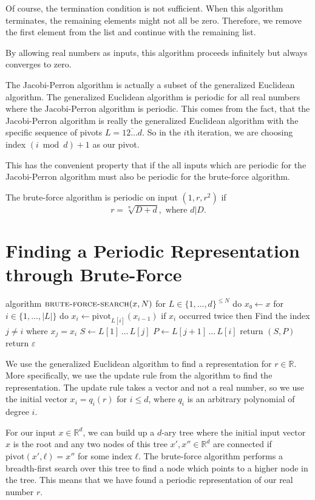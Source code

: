 Of course, the termination condition is not sufficient.
When this algorithm terminates, the remaining elements might not all be zero.
Therefore, we remove the first element from the list and continue with the
remaining list.

By allowing real numbers as inputs, this algorithm proceeds infinitely but
always converges to zero.

The Jacobi-Perron algorithm is actually a subset of the generalized Euclidean algorithm.
The generalized Euclidean algorithm is periodic for all real numbers where the Jacobi-Perron algorithm is periodic.
This comes from the fact, that the Jacobi-Perron algorithm is really the
generalized Euclidean algorithm with the specific sequence of pivots $L = \overline{12…d}$.
So in the $i$th iteration, we are choosing index $(i \bmod d) + 1$ as our pivot.

This has the convenient property that if the all inputs which are periodic for
the Jacobi-Perron algorithm must also be periodic for the brute-force algorithm.

\begin{theorem}
  The brute-force algorithm is periodic on input $(1, r, r^2)$ if
  \[
    r = \sqrt[n]{D + d}, \text{ where } d | D.
  \]
\end{theorem}

\section{Finding a Periodic Representation through Brute-Force}

\begin{Pseudocode}
algorithm $\textsc{brute-force-search}(x, N)$
  for $L ∈ \{1, …, d\}^{≤ N}$ do
    $x₀ ← x$
    for $i ∈ \{1, …, |L|\}$ do
      $x_i ← \mathrm{pivot}_{L[i]}(x_{i-1})$
      if $x_i$ occurred twice then
        Find the index $j ≠ i$ where $x_j = x_i$
        $S ← L[1] \,…\, L[j]$
        $P ← L[j+1] \,…\, L[i]$
        return $(S, P)$
  return $ε$
\end{Pseudocode}

We use the generalized Euclidean algorithm to find a representation for $r ∈ ℝ$.
More specifically, we use the update rule from the algorithm to find the
representation.
The update rule takes a vector and not a real number, so we use the initial
vector $x_i = q_i(r)$ for $i ≤ d$, where $q_i$ is an arbitrary polynomial of
degree $i$.

For our input $x ∈ ℝ^d$, we can build up a $d$-ary tree where the initial input
vector $x$ is the root and any two nodes of this tree $x', x'' ∈ ℝ^d$ are
connected if $\mathrm{pivot}(x', ℓ) = x''$ for some index $ℓ$.
The brute-force algorithm performs a breadth-first search over this tree to
find a node which points to a higher node in the tree.
This means that we have found a periodic representation of our real number $r$.

